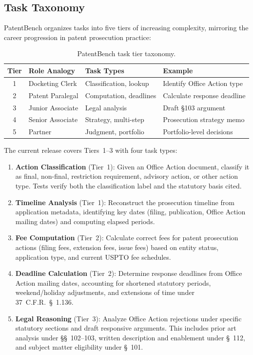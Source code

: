 \documentclass[11pt]{article}
\begin{document}
\subsection{Task Taxonomy}
\label{sec:taxonomy}

PatentBench organizes tasks into five tiers of increasing complexity, mirroring the career progression in patent prosecution practice:

\begin{table}[H]
\centering
\caption{PatentBench task tier taxonomy.}
\label{tab:tiers}
\begin{tabular}{@{}clll@{}}
\toprule
\textbf{Tier} & \textbf{Role Analogy} & \textbf{Task Types} & \textbf{Example} \\
\midrule
1 & Docketing Clerk & Classification, lookup & Identify Office Action type \\
2 & Patent Paralegal & Computation, deadlines & Calculate response deadline \\
3 & Junior Associate & Legal analysis & Draft \S103 argument \\
4 & Senior Associate & Strategy, multi-step & Prosecution strategy memo \\
5 & Partner & Judgment, portfolio & Portfolio-level decisions \\
\bottomrule
\end{tabular}
\end{table}

The current release covers Tiers~1--3 with four task types:

\begin{enumerate}[leftmargin=*]
    \item \textbf{Action Classification} (Tier~1): Given an Office Action document, classify it as final, non-final, restriction requirement, advisory action, or other action type. Tests verify both the classification label and the statutory basis cited.

    \item \textbf{Timeline Analysis} (Tier~1): Reconstruct the prosecution timeline from application metadata, identifying key dates (filing, publication, Office Action mailing dates) and computing elapsed periods.

    \item \textbf{Fee Computation} (Tier~2): Calculate correct fees for patent prosecution actions (filing fees, extension fees, issue fees) based on entity status, application type, and current USPTO fee schedules.

    \item \textbf{Deadline Calculation} (Tier~2): Determine response deadlines from Office Action mailing dates, accounting for shortened statutory periods, weekend/holiday adjustments, and extensions of time under 37~C.F.R.~\S~1.136.

    \item \textbf{Legal Reasoning} (Tier~3): Analyze Office Action rejections under specific statutory sections and draft responsive arguments. This includes prior art analysis under \S\S~102--103, written description and enablement under \S~112, and subject matter eligibility under \S~101.
\end{enumerate}
\end{document}
